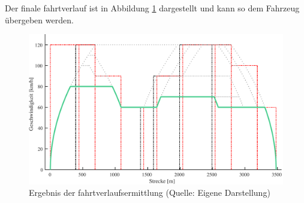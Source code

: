Der finale \Gls{fahrtverlauf} ist in Abbildung \ref{fig:it13} dargestellt und kann so dem Fahrzeug übergeben werden.
\begin{figure}
  \includegraphics[width=\linewidth]{../images/matlab/it13.pdf}
  \caption[Ergebnis der \Gls{fahrtverlauf}sermittlung]{Ergebnis der \Gls{fahrtverlauf}sermittlung (Quelle: Eigene Darstellung)}
  \label{fig:it13}
\end{figure}
\newpage
